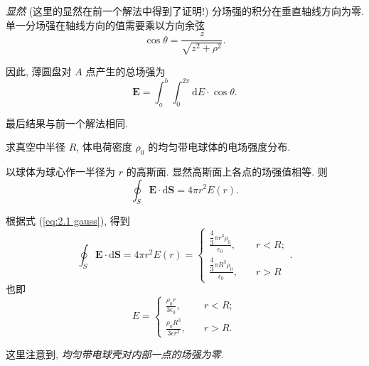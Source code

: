 \begin{exampleprob}[均匀带电环形薄圆盘的场强]
\begin{solution}[2 先计算分场强]
        \textit{显然} (这里的显然在前一个解法中得到了证明!) 分场强的积分在垂直轴线方向为零. 单一分场强在轴线方向的值需要乘以方向余弦
        \begin{equation*}
            \cos\theta=\frac{z}{\sqrt{z^2+\rho^2}}.
        \end{equation*}

        因此, 薄圆盘对 $A$ 点产生的总场强为
        \begin{equation*}
            \bm{E}=\int_{a}^{b}\int_{0}^{2\pi}\mathrm{d}E\cdot\cos\theta.
        \end{equation*}

        最后结果与前一个解法相同.
    \end{solution}
\end{exampleprob}

\begin{exampleprob}[均匀带电球体的场强]
    求真空中半径 $R$, 体电荷密度 $\rho_0$ 的均匀带电球体的电场强度分布.

    \begin{solution}
        以球体为球心作一半径为 $r$ 的高斯面. 显然高斯面上各点的场强值相等. 则
        \begin{equation*}
            \oint_S\bm{E}\cdot\mathrm{d}\bm{S}=4\pi r^2E(r).
        \end{equation*}

        根据式 (\ref{eq:2.1 gauss}), 得到
        \begin{equation*}
            \oint_S\bm{E}\cdot\mathrm{d}\bm{S}=4\pi r^2E(r)=\begin{cases}
                \frac{\dfrac{4}{3}\pi r^3\rho_0}{\epsilon_0}, & \quad r<R; \\
                \frac{\dfrac{4}{3}\pi R^3\rho_0}{\epsilon_0}, & \quad r>R
            \end{cases}.
        \end{equation*}
        也即
        \begin{equation*}
            E=\begin{cases}
                \frac{\rho_0 r}{3\epsilon_0},     & \quad r<R; \\
                \frac{\rho_0 R^3}{3\epsilon r^2}, & \quad r>R.
            \end{cases}
        \end{equation*}

        这里注意到, \textit{均匀带电球壳对内部一点的场强为零}.
    \end{solution}
\end{exampleprob}
